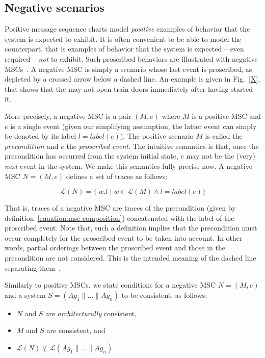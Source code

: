 \subsection{Negative scenarios}

Positive message sequence charts model \emph{positive} examples of behavior that the system is expected to exhibit. It is often convenient to be able to model the counterpart, that is examples of behavior that the system is expected -- even required -- \emph{not} to exhibit. Such proscribed behaviors are illustrated with negative MSCs~\cite{Uchitel:2004}. A negative MSC is simply a scenario whose last event is proscribed, as depicted by a crossed arrow below a dashed line. An example is given in Fig.~\ref{X}, that shows that the  may not open train doors immediately after having started it.

More precisely, a negative MSC is a pair $(M,e)$ where $M$ is a positive MSC and $e$ is a single event (given our simplifying assumption, the latter event can simply be denoted by its label $l = label(e)$). The positive scenario $M$ is called the $precondition$ and $e$ the \emph{proscribed event}. The intuitive semantics is that, once the precondition has occurred from the system initial state, $e$ may not be the (very) \emph{next} event in the system. We make this semantics fully precise now. A negative MSC $N = (M,e)$ defines a set of traces as follows:

\begin{equation*}
\mathcal{L}(N) = \{~w.l \mid w \in \mathcal{L}(M) \wedge l = label(e) \}
\end{equation*}

That is, traces of a negative MSC are traces of the precondition (given by definition~\ref{equation:msc-composition}) concatenated with the label of the proscribed event. Note that, such a definition implies that the precondition must occur completely for the proscribed event to be taken into account. In other words, partial orderings between the proscribed event and those in the precondition are not considered. This is the intended meaning of the dashed line separating them~\cite{Uchitel:2004}. 

Similarly to positive MSCs, we state conditions for a negative MSC $N = (M,e)$ and a system $S = (Ag_1 \parallel \ldots \parallel Ag_n)$ to be consistent, as follows:

\begin{itemize}
\item $N$ and $S$ are \emph{architecturally} consistent,
\item $M$ and $S$ are consistent, and
\item $\mathcal{L}(N) \not\subseteq \mathcal{L}(Ag_1 \parallel \ldots \parallel Ag_n)$
\end{itemize}

